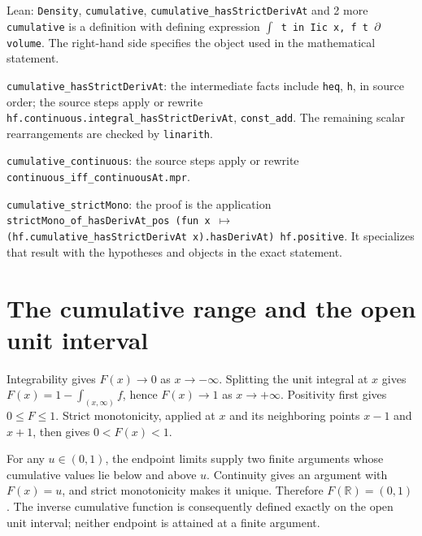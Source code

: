\documentclass[11pt,a4paper]{article}
\begin{document}
\begin{leanbox}{Lean: \texttt{Density}, \texttt{cumulative}, \texttt{cumulative\_\allowbreak{}hasStrictDerivAt} and 2 more}
\texttt{cumulative} is a definition with defining expression \texttt{\ensuremath{\int} t in Iic x, f t \ensuremath{\partial}volume}. The right-hand side specifies the object used in the mathematical statement.



\texttt{cumulative\_\allowbreak{}has\allowbreak{}Strict\allowbreak{}Deriv\allowbreak{}At}: the intermediate facts include \texttt{heq}, \texttt{h}, in source order; the source steps apply or rewrite \texttt{hf.\allowbreak{}continuous.\allowbreak{}integral\_\allowbreak{}has\allowbreak{}Strict\allowbreak{}Deriv\allowbreak{}At}, \texttt{const\_\allowbreak{}add}. The remaining scalar rearrangements are checked by \texttt{linarith}.



\texttt{cumulative\_\allowbreak{}continuous}: the source steps apply or rewrite \texttt{continuous\_\allowbreak{}iff\_\allowbreak{}continuous\allowbreak{}At.\allowbreak{}mpr}.



\texttt{cumulative\_\allowbreak{}strict\allowbreak{}Mono}: the proof is the application \texttt{strict\allowbreak{}Mono\_\allowbreak{}of\_\allowbreak{}has\allowbreak{}Deriv\allowbreak{}At\_\allowbreak{}pos (fun x \ensuremath{\mapsto} (hf.\allowbreak{}cumulative\_\allowbreak{}has\allowbreak{}Strict\allowbreak{}Deriv\allowbreak{}At x).\allowbreak{}has\allowbreak{}Deriv\allowbreak{}At) hf.\allowbreak{}positive}. It specializes that result with the hypotheses and objects in the exact statement.
\end{leanbox}

\section{\texorpdfstring{The cumulative range and the open unit interval}{The cumulative range and the open unit interval}}


Integrability gives \(F(x)\to0\) as \(x\to-\infty\). Splitting the unit integral at \(x\) gives \(F(x)=1-\int_{(x,\infty)}f\), hence \(F(x)\to1\) as \(x\to+\infty\). Positivity first gives \(0\le F\le1\). Strict monotonicity, applied at \(x\) and its neighboring points \(x-1\) and \(x+1\), then gives \(0<F(x)<1\).



For any \(u\in(0,1)\), the endpoint limits supply two finite arguments whose cumulative values lie below and above \(u\). Continuity gives an argument with \(F(x)=u\), and strict monotonicity makes it unique. Therefore \(F(\mathbb R)=(0,1)\). The inverse cumulative function is consequently defined exactly on the open unit interval; neither endpoint is attained at a finite argument.
\end{document}
